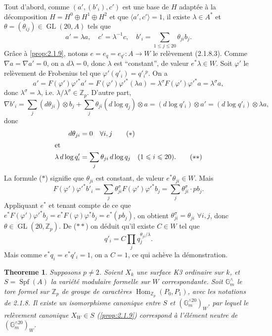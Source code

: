 \documentclass[12pt,a4paper]{article}
\theoremstyle{plain}
\newtheorem{theorem}{Theoreme}[section]
\theoremstyle{definition}
\theoremstyle{remark}
\DeclareMathOperator{\Hom}{Hom}
\DeclareMathOperator{\Spf}{Spf}
\providecommand{\Hom}{\operatorname{Hom}}
\providecommand{\GL}{\operatorname{GL}}
\begin{document}
Tout d'abord, comme $(a', (b'_i), c')$ est une base de $H$ adapt\'ee \`a la d\'ecomposition $H = H^0 \oplus H^1 \oplus H^2$ et que $\langle a', c' \rangle = 1$, il existe $\lambda \in A^*$ et $\theta = (\theta_{ij}) \in \GL(20, A)$ tels que
\[
a' = \lambda a, \quad c' = \lambda^{-1} c, \quad b'_i = \sum_{1\leqslant j\leqslant 20} \theta_{ji} b_j.
\]
Gr\^ace \`a \ref{prop:2.1.9}, notons $e = e_q = e_{q'} : A \to W$ le rel\`evement (2.1.8.3). Comme $\nabla a = \nabla a' = 0$, on a $d\lambda = 0$, donc $\lambda$ est ``constant'', de valeur $e^*\lambda \in W$. Soit $\varphi'$ le rel\`evement de Frobenius tel que $\varphi'(q'_i) = q'_i{}^p$. On a
\[
a' = F(\varphi')\varphi'^* a' = F(\varphi')\varphi'^*(\lambda a) = \lambda^\sigma F(\varphi')\varphi'^* a = \lambda^\sigma a,
\]
donc $\lambda^\sigma = \lambda$, i.e. $\lambda/\lambda^\sigma \in \mathbb{Z}_p$. D'autre part,
\[
\nabla b'_i = \sum_j (d\theta_{ji}) \otimes b_j + \sum_j \theta_{ji}(d\log q_j) \otimes a = (d\log q'_i) \otimes a' = (d\log q'_i) \otimes \lambda a,
\]
donc
\begin{align*}
d\theta_{ji} &= 0 \quad \forall i, j \tag{$\ast$} \\
\intertext{et}
\lambda \, d\log q'_i &= \sum_j \theta_{ji} \, d\log q_j \quad (1 \leqslant i \leqslant 20). \tag{$\ast\ast$}
\end{align*}
La formule ($\ast$) signifie que $\theta_{ji}$ est constant, de valeur $e^*\theta_{ji} \in W$. Mais
\[
F(\varphi')\varphi'^* b'_i = \sum_j \theta_{ji}^\sigma F(\varphi')\varphi'^* b_j = \sum_j \theta_{ji}^\sigma \cdot pb_j.
\]
Appliquant $e^*$ et tenant compte de ce que $e^*F(\varphi')\varphi'^* b_j = e^*F(\varphi)\varphi^* b_j = e^*(pb_j)$, on obtient $\theta_{ji}^\sigma = \theta_{ji}$ $\forall i, j$, donc $\theta \in \GL(20, \mathbb{Z}_p)$. De ($\ast\ast$) on d\'eduit qu'il existe $C \in W$ tel que
\[
q'_i = C \prod_j q_j^{\theta_{ji}/\lambda}.
\]
Mais comme $e^* q_i = e^* q'_i = 1$, on a $C = 1$, ce qui ach\`eve la d\'emonstration.

\begin{theorem}\label{thm:2.1.14}
Supposons $p \neq 2$. Soient $X_k$ une surface K3 ordinaire sur $k$, et $S = \Spf(A)$ la vari\'et\'e modulaire formelle sur $W$ correspondante. Soit $\mathbb{G}_m^{\wedge}$ le tore formel sur $\mathbb{Z}_p$ de groupe de caract\`eres $\Hom_{\mathbb{Z}_p}(P_0, P_1)$, avec les notations de 2.1.8. Il existe un isomorphisme canonique entre $S$ et $(\mathbb{G}_m^{\wedge 20})_W$, par lequel le rel\`evement canonique $X_W \in S$ (\ref{prop:2.1.9}) correspond \`a l'\'el\'ement neutre de $(\mathbb{G}_m^{\wedge 20})_W$.
\end{theorem}
\end{document}
